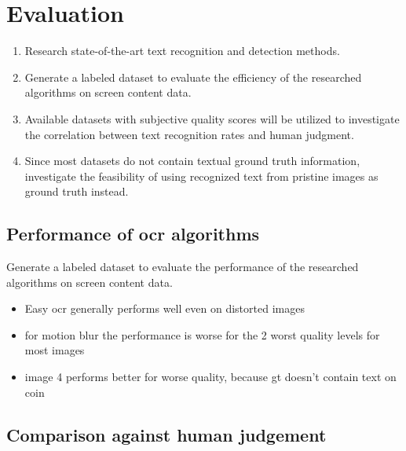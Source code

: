 \chapter{Evaluation}
\label{chap:evaluation}

\begin{enumerate}
\item Research state-of-the-art text recognition and detection methods.

\item Generate a labeled dataset to evaluate the efficiency of the researched algorithms
   on screen content data.

\item Available datasets with subjective quality scores will be utilized to investigate
   the correlation between text recognition rates and human judgment.

\item Since most datasets do not contain textual ground truth information,
   investigate the feasibility of using recognized text from pristine images as ground truth instead.
\end{enumerate}

\section{Performance of ocr algorithms}
\label{sec:ocr_performance}

Generate a labeled dataset to evaluate the performance of the researched algorithms
on screen content data.

\begin{itemize}
\item Easy ocr generally performs well even on distorted images
\item for motion blur the performance is worse for the 2 worst quality levels for most images
\item image 4 performs better for worse quality, because gt doesn't contain text on coin
\end{itemize}


\section{Comparison against human judgement}
\label{sec:comparison_against_human_judgement}


